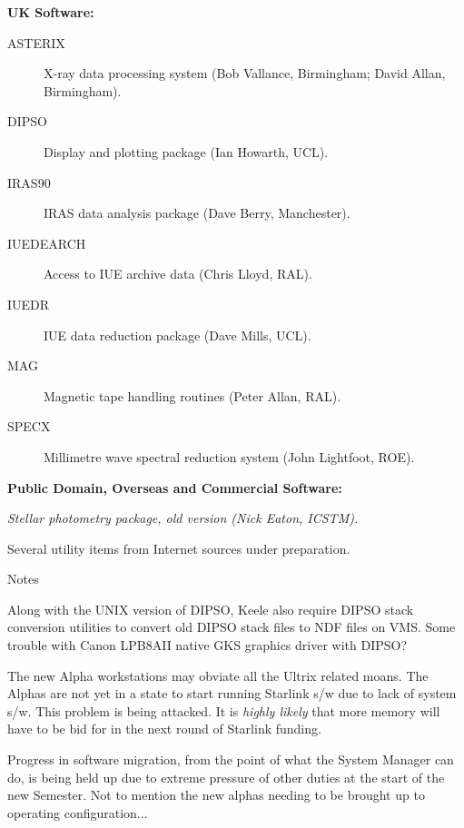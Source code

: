 \begin{center}
{\bf UK Software:}
\end{center}

\begin{description}
\item[ASTERIX] X-ray data processing system (Bob Vallance, Birmingham;
David Allan, Birmingham).
\item[DIPSO] Display and plotting package (Ian Howarth, UCL).
\item[IRAS90] IRAS data analysis package (Dave Berry, Manchester).
\item[IUEDEARCH] Access to IUE archive data (Chris Lloyd, RAL).
\item[IUEDR] IUE data reduction package (Dave Mills, UCL).
\item[MAG] Magnetic tape handling routines (Peter Allan, RAL).
\item[SPECX] Millimetre wave spectral reduction system (John Lightfoot, ROE).
\end{description}


\newpage
\vspace{5mm}
\begin{center}
{\bf Public Domain, Overseas and Commercial Software:}
\end{center}

\begin{description}
\item[{\em DAOPHOT}] {\em Stellar photometry package, old version (Nick
Eaton, ICSTM).}
\item  Several utility items from Internet sources under preparation.
\end{description}


\vspace{5mm}
\begin{center}
{\large\sc Notes}
\end{center}

Along with the UNIX version of DIPSO, Keele also require DIPSO stack conversion
utilities to convert old DIPSO stack files to NDF files on VMS.
Some trouble with Canon LPB8AII native GKS graphics driver with DIPSO?

The new Alpha workstations may obviate all the Ultrix related moans. The
Alphas are not yet in a state to start running Starlink s/w due to lack of
system s/w. This problem is being attacked.  It is {\em highly likely} that
more memory will have to be bid for in the next round of Starlink funding.

Progress in software migration, from the point of what the System Manager
can do, is being held up due to extreme pressure of other duties at the
start of the new Semester. Not to mention the new alphas needing to be
brought up to operating configuration...

